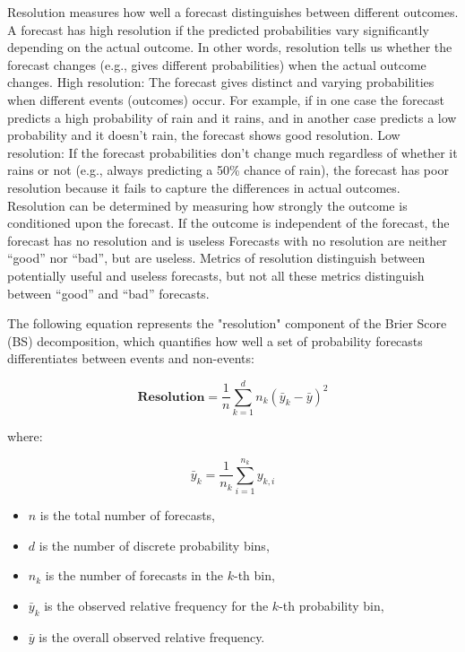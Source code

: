 Resolution measures how well a forecast distinguishes between different outcomes. A forecast has high resolution if the predicted probabilities vary significantly depending on the actual outcome. In other words, resolution tells us whether the forecast changes (e.g., gives different probabilities) when the actual outcome changes.
High resolution: The forecast gives distinct and varying probabilities when different events (outcomes) occur. For example, if in one case the forecast predicts a high probability of rain and it rains, and in another case predicts a low probability and it doesn’t rain, the forecast shows good resolution.
Low resolution: If the forecast probabilities don’t change much regardless of whether it rains or not (e.g., always predicting a 50\% chance of rain), the forecast has poor resolution because it fails to capture the differences in actual outcomes.
Resolution can be determined by measuring how strongly the outcome is conditioned upon the forecast.
If the outcome is independent of the forecast, the forecast has no resolution and is useless
Forecasts with no resolution are neither “good” nor “bad”, but are useless. 
Metrics of resolution distinguish between potentially useful and useless forecasts, but not all these metrics distinguish between “good” and “bad” forecasts.

The following equation represents the "resolution" component of the Brier Score (BS) decomposition, which quantifies how well a set of probability forecasts differentiates between events and non-events:

\begin{equation}
\textbf {Resolution} = \frac{1}{n} \sum_{k=1}^{d} n_k \left( \bar{y}_k - \bar{y} \right)^2
\end{equation}

where:

\begin{equation}
\bar{y}_k = \frac{1}{n_k} \sum_{i=1}^{n_k} y_{k,i}
\end{equation}

\begin{itemize}
    \item $n$ is the total number of forecasts,
    \item $d$ is the number of discrete probability bins,
    \item $n_k$ is the number of forecasts in the $k$-th bin,
    \item $\bar{y}_k$ is the observed relative frequency for the $k$-th probability bin,
    \item $\bar{y}$ is the overall observed relative frequency.
\end{itemize}

